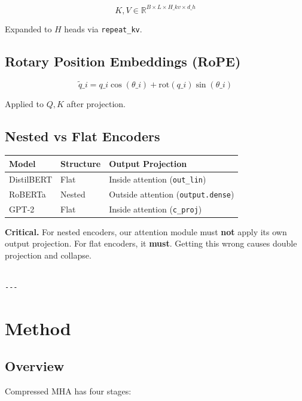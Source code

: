 \[
K, V \in \mathbb{R}^{B \times L \times H\_{kv} \times d\_h}
\]

Expanded to $H$ heads via \texttt{repeat\_kv}.

\subsection{Rotary Position Embeddings (RoPE)}

\[
\tilde{q}\_i = q\_i \cos(\theta\_i) + \text{rot}(q\_i) \sin(\theta\_i)
\]

Applied to $Q, K$ after projection.

\subsection{Nested vs Flat Encoders}

\begin{table}[H]
\centering
\small
\begin{tabular}{lll}
\toprule
\textbf{Model} & \textbf{Structure} & \textbf{Output Projection} \\
\midrule
DistilBERT & Flat & Inside attention (\texttt{out\_lin}) \\
RoBERTa & Nested & Outside attention (\texttt{output.dense}) \\
GPT-2 & Flat & Inside attention (\texttt{c\_proj}) \\
\bottomrule
\end{tabular}
\end{table}

\textbf{Critical.} For nested encoders, our attention module must \textbf{not} apply 
its own output projection. For flat encoders, it \textbf{must}. Getting this 
wrong causes double projection and collapse.
\begin{lstlisting}

---
\end{lstlisting}

\section{Method}

\subsection{Overview}

Compressed MHA has four stages:

